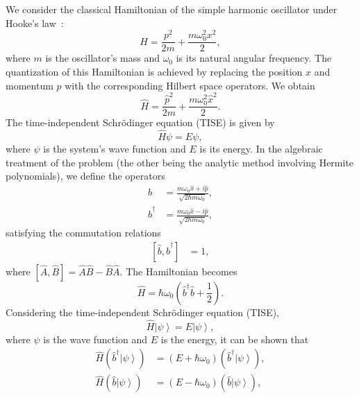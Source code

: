 \documentclass[5p, twocolumn, 10pt, sort&compress]{elsarticle}
\newcommand{\ket}[1]{\left|{#1}\right\rangle}
\newcommand{\comm}[2]{\left[{#1},{#2}\right]}
\newcommand{\bop}{\hat{b}}
\newcommand{\bdag}{\bop^\dagger}
\begin{document}
We consider the classical Hamiltonian of the simple harmonic oscillator under Hooke's law~\cite{griffiths_introduction_2018}:
\begin{equation}
    H = \frac{p^2}{2m} + \frac{m\omega_0^2x^2}{2},
\end{equation}
where $m$ is the oscillator's mass and $\omega_0$ is its natural angular frequency. The quantization of this Hamiltonian is achieved by replacing the position $x$ and momentum $p$ with the corresponding Hilbert space operators. We obtain
\begin{equation}\label{eq:SHO_Ham}
    \hat{H} = \frac{\hat{p}^2}{2m} + \frac{m\omega_0^2\hat{x}^2}{2}.
\end{equation}
The time-independent Schr\"{o}dinger equation (TISE) is given by
\begin{equation}
    \hat{H}\psi = E\psi,
\end{equation}
where $\psi$ is the system's wave function and $E$ is its energy.  In the algebraic treatment of the problem (the other being the analytic method involving Hermite polynomials), we define the operators
\begin{subequations}
\begin{align}
    \bop &= \frac{m\omega_0 \hat{x}+i\hat{p}}{\sqrt{2\hbar m\omega_0}},
    \\
    \bdag &= \frac{m\omega_0 \hat{x}-i\hat{p}}{\sqrt{2\hbar m\omega_0}},
\end{align}
\end{subequations}
satisfying the commutation relations
\begin{align}
    \comm{\bop}{\bdag}&=1,
\end{align}
where $\comm{\hat{A}}{\hat{B}}=\hat{A}\hat{B}-\hat{B}\hat{A}$.  The Hamiltonian becomes
\begin{equation}
    \hat{H} = \hbar\omega_0\left(\bdag\bop+\frac{1}{2}\right).
\end{equation}
Considering the time-independent Schr\"{o}dinger equation (TISE),
\begin{equation}
    \hat{H}\ket{\psi} = E\ket{\psi},
\end{equation}
where $\psi$ is the wave function and $E$ is the energy, it can be shown that 
\begin{subequations}
    \begin{align}
        \hat{H}\left(\bdag\ket{\psi}\right) &= \left(E+\hbar\omega_0\right)\left(\bdag\ket{\psi}\right),
        \\
        \hat{H}\left(\bop\ket{\psi}\right) &= \left(E-\hbar\omega_0\right)\left(\bop\ket{\psi}\right),
    \end{align}
\end{subequations}
\end{document}
